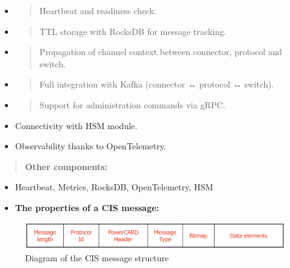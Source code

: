 \documentclass[12pt,a4paper]{report}
\begin{document}
\begin{itemize}
\item
  \begin{quote}
  Heartbeat and readiness check.
  \end{quote}
\item
  \begin{quote}
  TTL storage with RocksDB for message tracking.
  \end{quote}
\item
  \begin{quote}
  Propagation of channel context between connector, protocol and switch.
  \end{quote}
\item
  \begin{quote}
  Full integration with Kafka (connector ↔ protocol ↔ switch).
  \end{quote}
\item
  \begin{quote}
  Support for administration commands via gRPC.
  \end{quote}
\end{itemize}

\begin{itemize}
\item
  Connectivity with HSM module.
\item
  Observability thanks to OpenTelemetry.
\end{itemize}

\begin{quote}
\textbf{Other components:}
\end{quote}

\begin{itemize}
\item
  Heartbeat, Metrics, RocksDB, OpenTelemetry, HSM
\end{itemize}

\begin{itemize}
\item
  \textbf{The properties of a CIS message:}
\end{itemize}


\begin{figure}[H]
\centering
\includegraphics[width=6.31605in]{media/image33.png}
\caption{Diagram of the CIS
message structure}
\label{fig:DiagramMS}
\end{figure}
\end{document}
